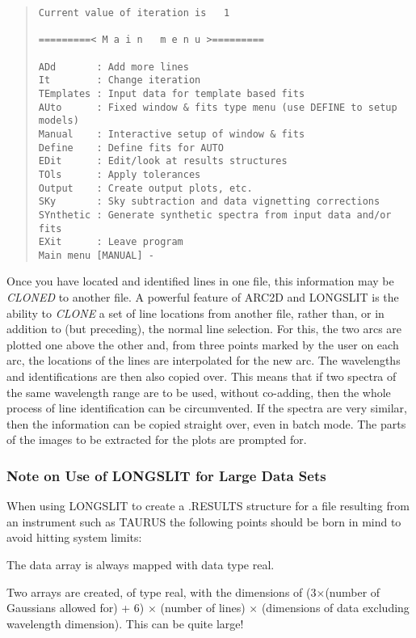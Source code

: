 \begin{quote}\begin{verbatim}
Current value of iteration is   1
 
=========< M a i n   m e n u >=========
 
ADd       : Add more lines
It        : Change iteration
TEmplates : Input data for template based fits
AUto      : Fixed window & fits type menu (use DEFINE to setup models)
Manual    : Interactive setup of window & fits
Define    : Define fits for AUTO
EDit      : Edit/look at results structures
TOls      : Apply tolerances
Output    : Create output plots, etc.
SKy       : Sky subtraction and data vignetting corrections
SYnthetic : Generate synthetic spectra from input data and/or fits
EXit      : Leave program
Main menu [MANUAL] -
\end{verbatim}\end{quote}

Once you have located and identified lines in one file, this information
may be {\em CLONED} to another file.
A powerful feature of ARC2D and LONGSLIT
is the ability to {\em CLONE} a set of line locations from another
file, rather than, or in addition to (but preceding), the normal line
selection. For this, the two arcs are plotted one above the other
and, from three points marked by the user on each
arc, the locations of the lines are interpolated for the new arc. The
wavelengths and identifications are then also copied over. This means
that if two spectra of the same wavelength range are to be used,
without co-adding, then the whole process of line identification can be
circumvented. If the spectra are very similar, then the information can
be copied straight over, even in batch mode.
The parts of the images to be extracted for the plots are prompted for.

\subsubsection{Note on Use of LONGSLIT for Large Data Sets}

When using LONGSLIT to create a .RESULTS structure for a file
resulting from an instrument such as TAURUS the following points should
be born in mind to avoid hitting system limits:
\begin{list}{()}{}
\item The data array is always mapped with data type real.
\item Two arrays are created, of type real, with the dimensions of
(3$\times$(number of Gaussians allowed for) + 6) $\times$ (number of
lines) $\times$ (dimensions of data excluding wavelength dimension).
This can be quite large!
\end{list}

